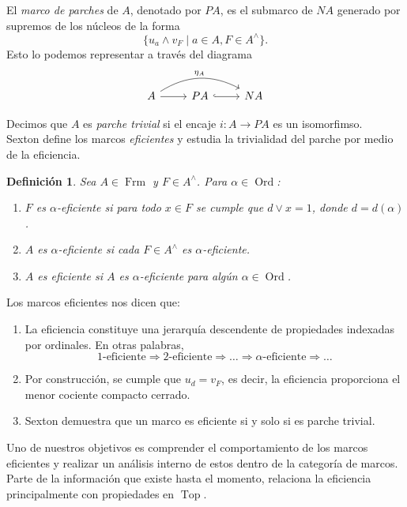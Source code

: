\documentclass[12pt]{article}
\newtheorem{dfn}[thm]{Definición}
\DeclareMathOperator{\Frm}{Frm}
\DeclareMathOperator{\Ord}{Ord}
\DeclareMathOperator{\Top}{Top}
\begin{document}
El \emph{marco de parches} de $A$, denotado por $PA$, es el submarco de $NA$ generado por supremos de los núcleos de la forma
\[
\{u_a\wedge v_F\mid a\in A, F\in A^\wedge\}. 
\]
Esto lo podemos representar a través del diagrama
\[\begin{tikzcd}
A \arrow[r] \arrow[rr, "\eta_A", bend left] & PA \arrow[r, hook] & NA
\end{tikzcd}\]

Decimos que $A$ es \emph{parche trivial} si el encaje $i\colon A\to PA$ es un isomorfimso.\\

Sexton define los marcos \emph{eficientes} y estudia la trivialidad del parche por medio de la eficiencia.

\begin{dfn}\label{eficientes}
Sea $A\in \Frm$ y $F\in A^\wedge$. Para $\alpha\in \Ord$:
\begin{enumerate}
\item $F$ es $\alpha$-eficiente si para todo $x\in F$ se cumple que $d\vee x=1$, donde $d=d(\alpha)$.
\item $A$ es $\alpha$-eficiente si cada $F\in A^\wedge$ es $\alpha$-eficiente.
\item $A$ es eficiente si $A$ es $\alpha$-eficiente para algún $\alpha\in \Ord$.
\end{enumerate}
\end{dfn}

Los marcos eficientes nos dicen que:
\begin{enumerate}
    \item La eficiencia constituye una jerarquía descendente de propiedades indexadas por ordinales. En otras palabras,
    \[
    1\text{-eficiente}\Rightarrow 2\text{-eficiente}\Rightarrow\dots\Rightarrow \alpha\text{-eficiente}\Rightarrow \dots
    \]
    \item Por construcción, se cumple que $u_d=v_F$, es decir, la eficiencia proporciona el menor cociente compacto cerrado.
    \item Sexton demuestra que un marco es eficiente si y solo si es parche trivial.
\end{enumerate}

Uno de nuestros objetivos es comprender el comportamiento de los marcos eficientes y realizar un análisis interno de estos dentro de la categoría de marcos.
Parte de la información que existe hasta el momento, relaciona la eficiencia principalmente con propiedades en $\Top$.\\
\end{document}
